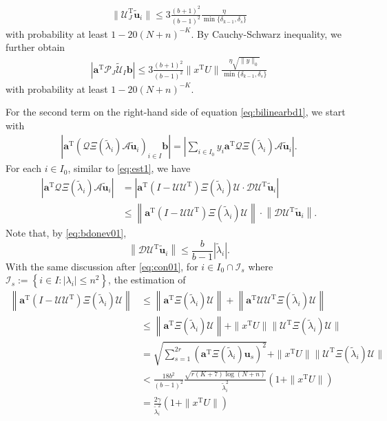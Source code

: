 \documentclass[reqno]{amsart}
\newcommand{\T}{\mathrm{T}}
\theoremstyle{plain}
\theoremstyle{definition}
\begin{document}
\begin{align*}
\| \mathcal U_J^\T \widetilde{\mathbf u}_i \| \le 3 \frac{(b+1)^2}{(b-1)^2}  \frac{\eta}{\min\{\delta_{k-1}, \delta_s\}}
\end{align*}
with probability at least $1-20(N+n)^{-K}$. By Cauchy-Schwarz inequality, we further obtain
\begin{align}\label{eq:bilinear1}
 \left| \mathbf a^\T \mathcal P_J \widetilde{\mathcal U}_I \mathbf b \right| \le 3 \frac{(b+1)^2}{(b-1)^2}  \| x^\T U\| \frac{\eta \sqrt{\|y\|_0}}{\min\{\delta_{k-1}, \delta_s\}}
\end{align}
with probability at least $1-20(N+n)^{-K}$.

For the second term on the right-hand side of equation \eqref{eq:bilinearbd1},  we start with
\begin{align}\label{eq:bili01}
 \left| \mathbf a^\T (\mathcal Q \Xi(\widetilde \lambda_i) \mathcal A \widetilde{\mathbf u}_i)_{i\in I} \mathbf b \right| = \left| \sum_{i\in I_0} y_i \mathbf a^\T \mathcal Q \Xi(\widetilde \lambda_i) \mathcal A \widetilde{\mathbf u}_i \right|.
\end{align}
For each $i\in I_0$, similar to \eqref{eq:est1}, we have
\begin{align*}%
\left|\mathbf a^\T \mathcal Q \Xi(\widetilde \lambda_i) \mathcal A \widetilde{\mathbf u}_i \right| &=  \left| \mathbf a^\T (I-\mathcal U \mathcal U^\T) \Xi(\widetilde \lambda_i) \mathcal U \cdot \mathcal D \mathcal U^\T \widetilde{\mathbf u}_i \right|\nonumber\\
&\le  \left\| \mathbf a^\T (I-\mathcal U \mathcal U^\T) \Xi(\widetilde \lambda_i) \mathcal U \right\| \cdot \left\| \mathcal D \mathcal U^\T \widetilde{\mathbf u}_i \right\|.
\end{align*}
Note that, by \eqref{eq:bdonev01}, 
$$\left\| \mathcal D \mathcal U^\T \widetilde{\mathbf u}_i \right\| \le \frac{b}{b-1} |\widetilde{\lambda}_i|.$$
With the same discussion after \eqref{eq:con01}, for $i\in I_0 \cap \mathcal I_s$ where $\mathcal I_s := \left\{ i \in I: | \lambda_i| \le n^2 \right\}$, the estimation of 
\begingroup
\allowdisplaybreaks
\begin{align*}
\left\| \mathbf a^\T (I-\mathcal U \mathcal U^\T) \Xi(\widetilde \lambda_i) \mathcal U \right\| &\le \left\|\mathbf a^\T  \Xi(\widetilde \lambda_i) \mathcal U \right\| + \left\| \mathbf a^\T \mathcal U \mathcal U^\T \Xi(\widetilde \lambda_i) \mathcal U \right\|\nonumber\\
& \le \left\|\mathbf a^\T  \Xi(\widetilde \lambda_i) \mathcal U \right\| + \|x^\T U \| \|\mathcal U^\T \Xi(\widetilde \lambda_i) \mathcal U \|\\
&= \sqrt{\sum_{s=1}^{2r} \left(\mathbf a^\T  \Xi(\widetilde \lambda_i) \mathbf u_s \right)^2}+ \| x^\T U \| \|\mathcal U^\T \Xi(\widetilde \lambda_i) \mathcal U \|\\
&< \frac{18b^2}{(b-1)^2} \frac{ \sqrt{r(K+7)\log(N+n)}  }{\widetilde \lambda_i^2}(1+ \| x^\T U \|)\\
&=\frac{2\gamma}{\widetilde \lambda_i^2}(1+ \| x^\T U \|)
\end{align*}
\end{document}
